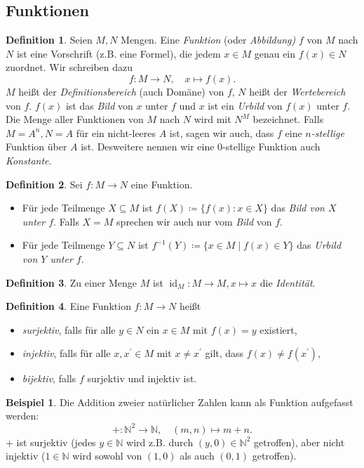 \documentclass[11pt, a4paper]{article}
\theoremstyle{definition}
\newtheorem{definition}{Definition}[section]
\newtheorem*{example*}{Beispiel}
\theoremstyle{plain}
\numberwithin{equation}{section}
\DeclareMathOperator{\id}{id}
\begin{document}
\subsection{Funktionen}\label{sec:pre_mappings}
\begin{definition}
	Seien $M, N$ Mengen. Eine \textit{Funktion} (oder \textit{Abbildung)} $f$ von $M$ nach $N$ ist eine Vorschrift (z.B. eine Formel), die jedem $x \in M$ genau ein $f(x) \in N$ zuordnet. Wir schreiben dazu
	$$
		f\colon M \to N, \quad x \mapsto f(x).
	$$
	$M$ heißt der \textit{Definitionsbereich} (auch Domäne) von $f$, $N$ heißt der \textit{Wertebereich} von $f$. $f(x)$ ist das \textit{Bild} von $x$ unter $f$ und $x$ ist ein \textit{Urbild} von $f(x)$ unter $f$. Die Menge aller Funktionen von $M$ nach $N$ wird mit $N^M$ bezeichnet. Falls $M = A^n, N = A$ für ein nicht-leeres $A$ ist, sagen wir auch, dass $f$ eine \textit{$n$-stellige} Funktion über $A$ ist. Desweitere nennen wir eine $0$-stellige Funktion auch \textit{Konstante}.
\end{definition}
\begin{definition}
	Sei $f\colon M \to N$ eine Funktion.
	\begin{itemize}
		\item Für jede Teilmenge $X \subseteq M$ ist $f(X) \coloneqq \{ f(x) : x \in X \}$ das \textit{Bild von $X$ unter $f$}. Falls $X = M$ sprechen wir auch nur vom \textit{Bild} von $f$.
		\item Für jede Teilmenge $Y \subseteq N$ ist $f^{-1}(Y) \coloneqq \{ x \in M \mid f(x) \in Y \}$ das \textit{Urbild von $Y$ unter $f$}.
	\end{itemize}
\end{definition}
\begin{definition}
	Zu einer Menge $M$ ist $\id_M\colon M \to M, x \mapsto x$ die \textit{Identität}.
\end{definition}
\begin{definition}
	Eine Funktion $f\colon M \to N$ heißt
	\begin{itemize}
		\item \textit{surjektiv}, falls für alle $y \in N$ ein $x \in M$ mit $f(x) = y$ existiert,
		\item \textit{injektiv}, falls für alle $x, x^\prime \in M$ mit $x \neq x^\prime$ gilt, dass $f(x) \neq f(x^\prime)$,
		\item \textit{bijektiv}, falls $f$ surjektiv und injektiv ist.
	\end{itemize}
\end{definition}
\begin{example*}
	Die Addition zweier natürlicher Zahlen kann als Funktion aufgefasst werden:
	$$
		+\colon \mathbb{N}^2 \to \mathbb{N}, \quad (m, n) \mapsto m+n.
	$$
	$+$ ist surjektiv (jedes $y \in \mathbb{N}$ wird z.B. durch $(y, 0) \in \mathbb{N}^2$ getroffen), aber nicht injektiv ($1 \in \mathbb{N}$ wird sowohl von $(1, 0)$ als auch $(0, 1)$ getroffen).
\end{example*}
\end{document}
